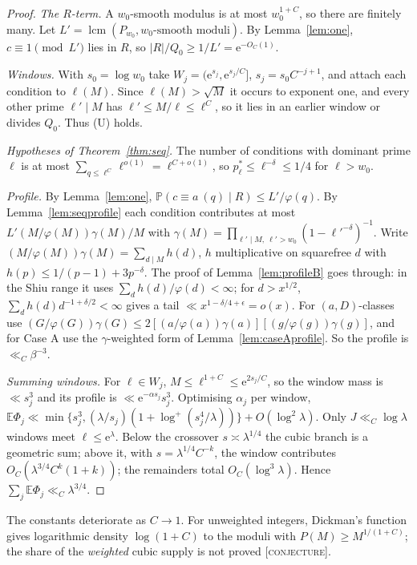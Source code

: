 \documentclass[10pt,reqno]{amsart}
\theoremstyle{definition}
\theoremstyle{remark}
\newcommand{\E}{\mathbb E}
\newcommand{\Prob}{\mathbb P}
\newcommand{\lcm}{\operatorname{lcm}}
\newcommand{\e}{\mathrm e}
\newcommand{\lab}[1]{\textup{[\textsc{#1}]}}
\begin{document}
\begin{proof}
\emph{The $R$-term.}  A $w_0$-smooth modulus is at most $w_0^{1+C}$, so there
are finitely many.  Let $L'=\lcm(P_{w_0},w_0\text{-smooth moduli})$.  By
Lemma~\ref{lem:one}, $c\equiv1\pmod{L'}$ lies in $R$, so
$|R|/Q_0\geq1/L'=\e^{-O_C(1)}$.

\emph{Windows.}  With $s_0=\log w_0$ take
$W_j=(\e^{s_j},\e^{s_j/C}]$, $s_j=s_0C^{-j+1}$, and attach each condition
to $\ell(M)$.  Since $\ell(M)>\sqrt M$ it occurs to exponent one, and every
other prime $\ell'\mid M$ has $\ell'\leq M/\ell\leq\ell^C$, so it lies in an
earlier window or divides $Q_0$.  Thus (U) holds.

\emph{Hypotheses of Theorem~\ref{thm:seq}.}  The number of conditions with
dominant prime $\ell$ is at most $\sum_{q\leq\ell^C}\ell^{o(1)}=\ell^{C+o(1)}$,
so $p^*_\ell\leq\ell^{-\delta}\leq1/4$ for $\ell>w_0$.

\emph{Profile.}  By Lemma~\ref{lem:one},
$\Prob(c\equiv a\ (q)\mid R)\leq L'/\varphi(q)$.  By
Lemma~\ref{lem:seqprofile} each condition contributes at most
$L'(M/\varphi(M))\gamma(M)/M$ with
$\gamma(M)=\prod_{\ell'\mid M,\ \ell'>w_0}(1-\ell'^{-\delta})^{-1}$.  Write
$(M/\varphi(M))\gamma(M)=\sum_{d\mid M}h(d)$, $h$ multiplicative on
squarefree $d$ with $h(p)\leq1/(p-1)+3p^{-\delta}$.  The proof of
Lemma~\ref{lem:profileB} goes through: in the Shiu range it uses
$\sum_dh(d)/\varphi(d)<\infty$; for $d>x^{1/2}$,
$\sum_dh(d)d^{-1+\delta/2}<\infty$ gives a tail $\ll x^{1-\delta/4+\epsilon}=o(x)$.
For $(a,D)$-classes use
$(G/\varphi(G))\gamma(G)\leq2[(a/\varphi(a))\gamma(a)][(g/\varphi(g))\gamma(g)]$,
and for Case A use the $\gamma$-weighted form of
Lemma~\ref{lem:caseAprofile}.  So the profile is $\ll_C\beta^{-3}$.

\emph{Summing windows.}  For $\ell\in W_j$, $M\leq\ell^{1+C}\leq\e^{2s_j/C}$,
so the window mass is $\ll s_j^3$ and its profile is
$\ll\e^{-\alpha s_j}s_j^3$.  Optimising $\alpha_j$ per window,
$\E\Phi_j\ll\min\{s_j^3,(\lambda/s_j)(1+\log^+(s_j^4/\lambda))\}+O(\log^2\lambda)$.
Only $J\ll_C\log\lambda$ windows meet $\ell\leq\e^\lambda$.  Below the
crossover $s\asymp\lambda^{1/4}$ the cubic branch is a geometric sum;
above it, with $s=\lambda^{1/4}C^{-k}$, the window contributes
$O_C(\lambda^{3/4}C^k(1+k))$; the remainders total $O_C(\log^3\lambda)$.
Hence $\sum_j\E\Phi_j\ll_C\lambda^{3/4}$.
\end{proof}
The constants deteriorate as $C\to1$.  For unweighted integers, Dickman's
function gives logarithmic density $\log(1+C)$ to the moduli with
$P(M)\geq M^{1/(1+C)}$; the share of the \emph{weighted} cubic supply is
not proved \lab{conjecture}.
\end{document}
